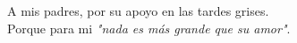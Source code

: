 \begin{dedication}
A mis padres, por su apoyo en las tardes grises.\\
Porque para mi \textit{"nada es más grande que su amor"}. 
\end{dedication}